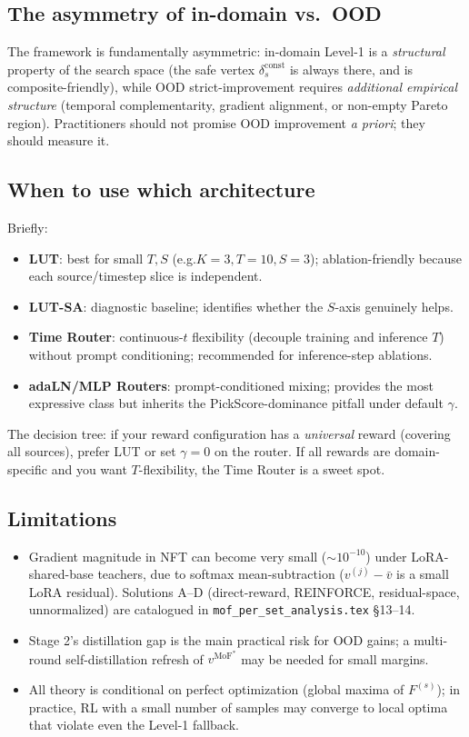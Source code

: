 \documentclass[11pt,a4paper]{article}
\newcommand{\MoF}{\mathrm{MoF}}
\newcommand{\const}{\mathrm{const}}
\theoremstyle{definition}
\begin{document}
\subsection{The asymmetry of in-domain vs.\ OOD}

The framework is fundamentally asymmetric: in-domain Level-1 is a
\emph{structural} property of the search space (the safe vertex
$\delta_s^{\const}$ is always there, and is composite-friendly), while OOD
strict-improvement requires \emph{additional empirical structure}
(temporal complementarity, gradient alignment, or non-empty Pareto
region). Practitioners should not promise OOD improvement \emph{a priori};
they should measure it.

\subsection{When to use which architecture}

Briefly:
\begin{itemize}[leftmargin=1.5em]
\item \textbf{LUT}: best for small $T,S$ (e.g.\@ $K=3, T=10, S=3$);
ablation-friendly because each source/timestep slice is independent.
\item \textbf{LUT-SA}: diagnostic baseline; identifies whether the
$S$-axis genuinely helps.
\item \textbf{Time Router}: continuous-$t$ flexibility (decouple training
and inference $T$) without prompt conditioning; recommended for
inference-step ablations.
\item \textbf{adaLN/MLP Routers}: prompt-conditioned mixing; provides
the most expressive class but inherits the PickScore-dominance pitfall
under default $\gamma$.
\end{itemize}

The decision tree: if your reward configuration has a \emph{universal}
reward (covering all sources), prefer LUT or set $\gamma=0$ on the router.
If all rewards are domain-specific and you want $T$-flexibility, the Time
Router is a sweet spot.

\subsection{Limitations}
\begin{itemize}[leftmargin=1.5em]
\item Gradient magnitude in NFT can become very small ($\sim 10^{-10}$) under
LoRA-shared-base teachers, due to softmax mean-subtraction
($v^{(j)}-\bar v$ is a small LoRA residual). Solutions A--D
(direct-reward, REINFORCE, residual-space, unnormalized) are catalogued in
\texttt{mof\_per\_set\_analysis.tex} \S13--14.
\item Stage 2's distillation gap is the main practical risk for OOD
gains; a multi-round self-distillation refresh of $v^{\MoF^*}$ may be
needed for small margins.
\item All theory is conditional on perfect optimization (global maxima of
$F^{(s)}$); in practice, RL with a small number of samples may converge
to local optima that violate even the Level-1 fallback.
\end{itemize}
\end{document}
